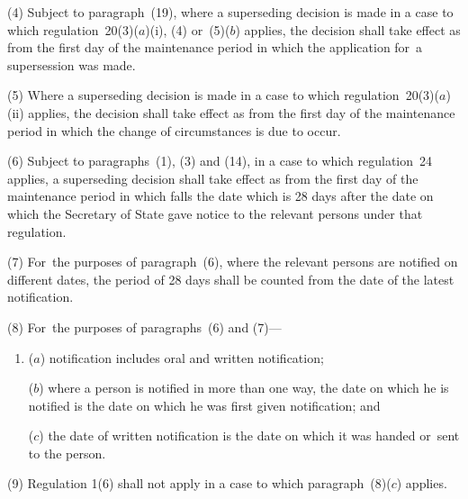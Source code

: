 \documentclass[a4paper,12pt]{article}
\begin{document}
(4) 
Subject to paragraph~(19), where a superseding decision is made  %
in a case to which regulation~20(3)($a$)(i), (4) or~(5)($b$) applies, the decision shall take effect as from the first day of the maintenance period in which the application for~a supersession was made.

(5) Where a superseding decision is made in a case to which regulation~20(3)($a$)(ii) applies, the decision shall take effect as from the first day of the maintenance period in which the change of circumstances is due to occur.

(6) Subject to paragraphs~(1), (3) and (14), in a case to which regulation~24 applies, a superseding decision shall take effect as from the first day of the maintenance period in which falls the date which is 28 days after the date on which the Secretary of State gave notice to the relevant persons under that regulation.

(7) For~the purposes of paragraph~(6), where the relevant persons are notified on different dates, the period of 28 days shall be counted from the date of the latest notification.

(8) For~the purposes of paragraphs~(6) and (7)---
\begin{enumerate}\item[]
($a$) notification includes oral and written notification;

($b$) where a person is notified in more than one way, the date on which he is notified is the date on which he was first given notification; and

($c$) the date of written notification is the date on which it was handed or~sent to the person.
\end{enumerate}

(9) Regulation 1(6) shall not apply in a case to which paragraph~(8)($c$) applies.
\end{document}
